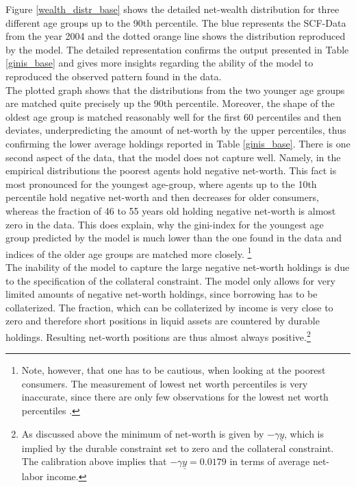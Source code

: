 \documentclass[a4paper,12pt,legno]{article}
\begin{document}
Figure \ref{wealth_distr_base} shows the detailed net-wealth distribution for three different age groups up to the 90th percentile. The blue represents the SCF-Data from the year 2004 and the dotted orange line shows the distribution reproduced by the model. The detailed representation confirms the output presented in Table \ref{ginis_base} and gives more insights regarding the ability of the model to reproduced the observed pattern found in the data. \\ 
The plotted graph shows that the distributions from the two younger age groups are matched quite precisely up the 90th percentile. Moreover, the shape of the oldest age group is matched reasonably well for the first 60 percentiles and then deviates, underpredicting the amount of net-worth by the upper percentiles, thus confirming the lower average holdings reported in Table \ref{ginis_base}. There is one second aspect of the data, that the model does not capture well. Namely, in the empirical distributions the poorest agents hold negative net-worth. This fact is most pronounced for the youngest age-group, where agents up to the 10th percentile hold negative net-worth and then decreases for older consumers, whereas the fraction of 46 to 55 years old holding negative net-worth is almost zero in the data. This does explain, why the gini-index for the youngest age group predicted by the model is much lower than the one found in the data and indices of the older age groups are matched more closely. \footnote{Note, however, that one has to be cautious, when looking at the poorest consumers. The measurement of lowest net worth percentiles is very inaccurate, since there are only few observations for the lowest net worth percentiles \citep{hintermaier2011}.} 
\\ The inability of the model to capture the large negative net-worth holdings is due to the specification of the collateral constraint. The model only allows for very limited amounts of negative net-worth holdings, since borrowing has to be collaterized. The fraction, which can be collaterized by income is very close to zero and therefore short positions in liquid assets are countered by durable holdings. Resulting net-worth positions are thus almost always positive.\footnote{As discussed above the minimum of net-worth is given by $-\gamma\underline{y}$, which is implied by the durable constraint set to zero and the collateral constraint. The calibration above implies that $-\gamma\underline{y} = 0.0179$ in terms of average net-labor income.} 
\end{document}
